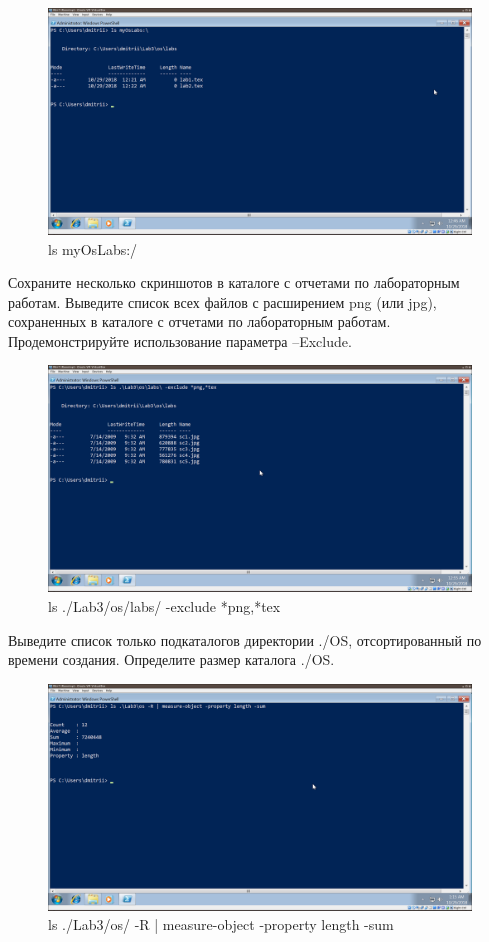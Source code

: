 \documentclass[a4paper]{article}
\begin{document}
\begin{figure}[H]
    \centering
    \includegraphics[width=\linewidth]{15.png}
    \caption{ls myOsLabs:/  }
\end{figure}

Сохраните несколько скриншотов в каталоге с отчетами по лабораторным работам. Выведите список всех файлов с расширением png (или jpg), сохраненных в каталоге с отчетами по лабораторным работам. Продемонстрируйте использование параметра –Exclude.


\begin{figure}[H]
    \centering
    \includegraphics[width=\linewidth]{16.png}
    \caption{ls ./Lab3/os/labs/ -exclude *png,*tex }
\end{figure}

Выведите список только подкаталогов директории ./OS, отсортированный по времени создания. Определите размер каталога ./OS.


\begin{figure}[H]
    \centering
    \includegraphics[width=\linewidth]{18-2.png}
    \caption{ls ./Lab3/os/ -R | measure-object -property length -sum }
\end{figure}
\end{document}
